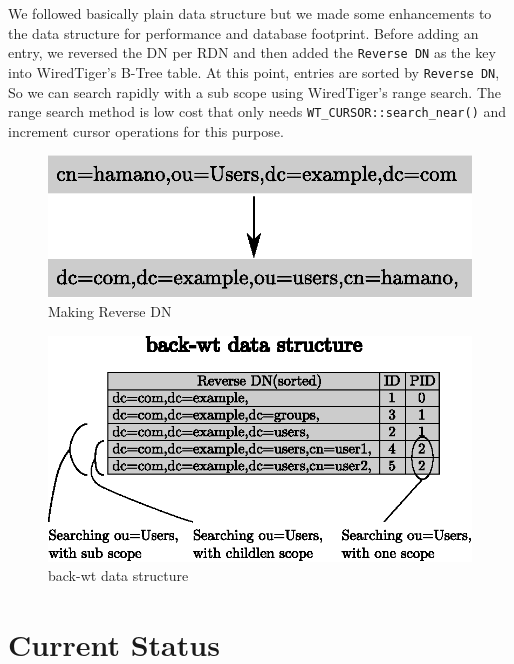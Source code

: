 \documentclass[a4paper
,twocolumn
]{article}
\begin{document}
We followed basically plain data structure but we made some enhancements
to the data structure for performance and database footprint. Before
adding an entry, we reversed the DN per RDN and then added the
\texttt{Reverse\ DN} as the key into WiredTiger's B-Tree table. At this
point, entries are sorted by \texttt{Reverse\ DN}, So we can search
rapidly with a sub scope using WiredTiger's range search. The range
search method is low cost that only needs
\texttt{WT\_CURSOR::search\_near()} and increment cursor operations for
this purpose.

\begin{figure}[H]
\centering
\includegraphics[width=0.9\columnwidth]{figure/reverse_dn.eps}
\caption{Making Reverse DN}
\end{figure}

\begin{figure}[H]
\centering
\includegraphics[width=0.9\columnwidth]{figure/back-wt_data_structure.eps}
\caption{back-wt data structure}
\end{figure}

\section{Current Status}\label{current-status}
\end{document}
